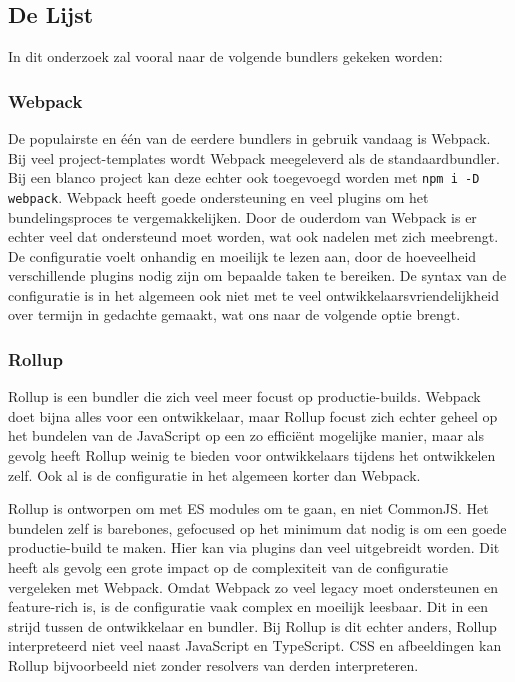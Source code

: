 
\subsection{De Lijst} 

In dit onderzoek zal vooral naar de volgende bundlers gekeken worden:

\subsubsection{Webpack}

De populairste en één van de eerdere bundlers in gebruik vandaag is Webpack. Bij veel project-templates wordt Webpack meegeleverd als de standaardbundler. Bij een blanco project kan deze echter ook toegevoegd worden met \lstinline{npm i -D webpack}. Webpack heeft goede ondersteuning en veel plugins om het bundelingsproces te vergemakkelijken. Door de ouderdom van Webpack is er echter veel dat ondersteund moet worden, wat ook nadelen met zich meebrengt. De configuratie voelt onhandig en moeilijk te lezen aan, door de hoeveelheid verschillende plugins nodig zijn om bepaalde taken te bereiken. De syntax van de configuratie is in het algemeen ook niet met te veel ontwikkelaarsvriendelijkheid over termijn in gedachte gemaakt, wat ons naar de volgende optie brengt.

\subsubsection{Rollup}

Rollup is een bundler die zich veel meer focust op productie-builds. Webpack doet bijna alles voor een ontwikkelaar, maar Rollup focust zich echter geheel op het bundelen van de JavaScript op een zo efficiënt mogelijke manier, maar als gevolg heeft Rollup weinig te bieden voor ontwikkelaars tijdens het ontwikkelen zelf. Ook al is de configuratie in het algemeen korter dan Webpack.

Rollup is ontworpen om met ES modules om te gaan, en niet CommonJS. Het bundelen zelf is barebones, gefocused op het minimum dat nodig is om een goede productie-build te maken. Hier kan via plugins dan veel uitgebreidt worden. Dit heeft als gevolg een grote impact op de complexiteit van de configuratie vergeleken met Webpack. Omdat Webpack zo veel legacy moet ondersteunen en feature-rich is, is de configuratie vaak complex en moeilijk leesbaar. Dit in een strijd tussen de ontwikkelaar en bundler. Bij Rollup is dit echter anders, Rollup interpreteerd niet veel naast JavaScript en TypeScript. CSS en afbeeldingen kan Rollup bijvoorbeeld niet zonder resolvers van derden interpreteren. \autocite{sweeney_2020}

